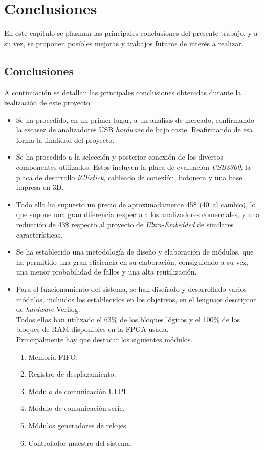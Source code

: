 \chapter{Conclusiones}
\label{ch:conclusiones}

En este capitulo se plasman las principales conclusiones del presente trabajo, y a su vez, se proponen posibles mejoras y trabajos futuros de interés a realizar.

\section{Conclusiones}
A continuación se detallan las principales conclusiones obtenidas durante la realización de este proyecto:

\begin{itemize}
    \item Se ha procedido, en un primer lugar, a un análisis de mercado, confirmando la escasez de analizadores USB \emph{hardware} de bajo coste. Reafirmando de esa forma la finalidad del proyecto.
    
    \item Se ha procedido a la selección y posterior conexión de los diversos componentes utilizados. Estos incluyen la placa de evaluación \emph{USB3300}, la placa de desarrollo \emph{iCEstick}, cableado de conexión, botonera y una base impresa en 3D.
    
    \item Todo ello ha supuesto un precio de aproximadamente 45\$ (40\texteuro~al cambio), lo que supone una gran diferencia respecto a los analizadores comerciales, y una reducción de 43\$ respecto al proyecto de \emph{Ultra-Embedded} de similares características.
    
    \item Se ha establecido una metodología de diseño y elaboración de módulos, que ha permitido una gran eficiencia en su elaboración, consiguiendo a su vez, una menor probabilidad de fallos y una alta reutilización.
    
    \item Para el funcionamiento del sistema, se han diseñado y desarrollado varios módulos, incluidos los establecidos en los objetivos, en el lenguaje descriptor de \emph{hardware} Verilog. \\
    Todos ellos han utilizado el 63\% de los bloques lógicos y el 100\% de los bloques de RAM disponibles en la FPGA usada. \\
    Principalmente hay que destacar los siguientes módulos.
    \begin{enumerate}
        \item Memoria FIFO.
        \item Registro de desplazamiento.
        \item Módulo de comunicación ULPI.
        \item Módulo de comunicación serie.
        \item Módulos generadores de relojes.
        \item Controlador maestro del sistema.
    \end{enumerate}


\end{itemize}

